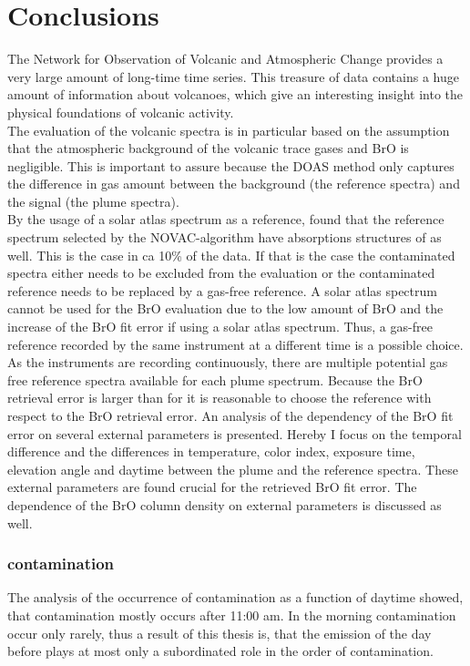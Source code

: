 \documentclass  [
  paper    = a4,
  BCOR     = 10mm,
  twoside,
  fontsize = 12pt,
  fleqn,
  toc      = bibnumbered,
  toc      = listofnumbered,
  numbers  = noendperiod,
  headings = normal,
  listof   = leveldown,
  version  = 3.03
]                                       {scrreprt}
\begin{document}
	\chapter{Conclusions}
  The Network for Observation of Volcanic and Atmospheric Change provides a very large amount of long-time time series. This treasure of data contains a huge amount of information about volcanoes, which give an interesting insight into the physical foundations of volcanic activity.\\
The evaluation of the volcanic spectra is in particular based on the assumption that the atmospheric background of the volcanic trace gases  and BrO is negligible. This is important to assure because the DOAS method only captures the difference in gas amount between the background (the reference spectra) and the signal (the plume spectra).\\
By the usage of a solar atlas spectrum as a reference, \citet{lubcke2016retrieval} found that the reference spectrum selected by the NOVAC-algorithm have absorptions structures of  as well. This is the case in ca 10\% of the data. If that is the case the contaminated spectra either needs to be excluded from the evaluation or the contaminated reference needs to be replaced by a gas-free reference.
A solar atlas spectrum cannot be used for the BrO evaluation due to the low amount of BrO and the increase of the BrO fit error if using a solar atlas spectrum. Thus, a gas-free reference recorded by the same instrument at a different time is a possible choice.
As the instruments are recording continuously, there are multiple potential gas free reference spectra available for each plume spectrum. Because the BrO retrieval error is larger than for  it is reasonable to choose the reference with respect to the BrO retrieval error.
An analysis of the dependency of the BrO fit error on several external parameters is presented. Hereby I focus on the temporal difference and the differences in temperature, color index, exposure time, elevation angle and daytime between the plume and the reference spectra. These external parameters are found crucial for the retrieved BrO fit error. The dependence of the BrO column density on external parameters is discussed as well.
\subsection*{ contamination}
The analysis of the occurrence of contamination as a function of daytime showed, that contamination mostly occurs after 11:00 am. In the morning contamination occur only rarely, thus a result of this thesis is, that the emission of the day before plays at most only a subordinated role in the order of  contamination. 
\end{document}
